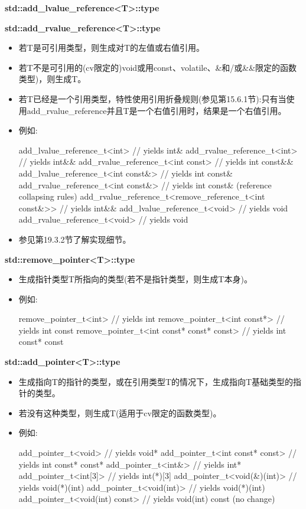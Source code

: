 \textbf{std::add\_lvalue\_reference<T>::type}

\textbf{std::add\_rvalue\_reference<T>::type}

\begin{itemize}
\item
若T是可引用类型，则生成对T的左值或右值引用。

\item
若T不是可引用的(cv限定的)void或用const、volatile、\&和/或\&\&限定的函数类型)，则生成T。

\item
若T已经是一个引用类型，特性使用引用折叠规则(参见第15.6.1节):只有当使用add\_rvalue\_reference并且T是一个右值引用时，结果是一个右值引用。

\item
例如:
\begin{cpp}
add_lvalue_reference_t<int> // yields int&
add_rvalue_reference_t<int> // yields int&&
add_rvalue_reference_t<int const> // yields int const&&
add_lvalue_reference_t<int const&> // yields int const&
add_rvalue_reference_t<int const&> // yields int const& (reference collapsing rules)
add_rvalue_reference_t<remove_reference_t<int const&>> // yields int&&
add_lvalue_reference_t<void> // yields void
add_rvalue_reference_t<void> // yields void
\end{cpp}

\item
参见第19.3.2节了解实现细节。
\end{itemize}

\textbf{std::remove\_pointer<T>::type}

\begin{itemize}
\item
生成指针类型T所指向的类型(若不是指针类型，则生成T本身)。

\item
例如:
\begin{cpp}
remove_pointer_t<int> // yields int
remove_pointer_t<int const*> // yields int const
remove_pointer_t<int const* const* const> // yields int const* const
\end{cpp}
\end{itemize}

\textbf{std::add\_pointer<T>::type}

\begin{itemize}
\item
生成指向T的指针的类型，或在引用类型T的情况下，生成指向T基础类型的指针的类型。

\item
若没有这种类型，则生成T(适用于cv限定的函数类型)。

\item
例如:
\begin{cpp}
add_pointer_t<void> // yields void*
add_pointer_t<int const* const> // yields int const* const*
add_pointer_t<int&> // yields int*
add_pointer_t<int[3]> // yields int(*)[3]
add_pointer_t<void(&)(int)> // yields void(*)(int)
add_pointer_t<void(int)> // yields void(*)(int)
add_pointer_t<void(int) const> // yields void(int) const (no change)
\end{cpp}
\end{itemize}

